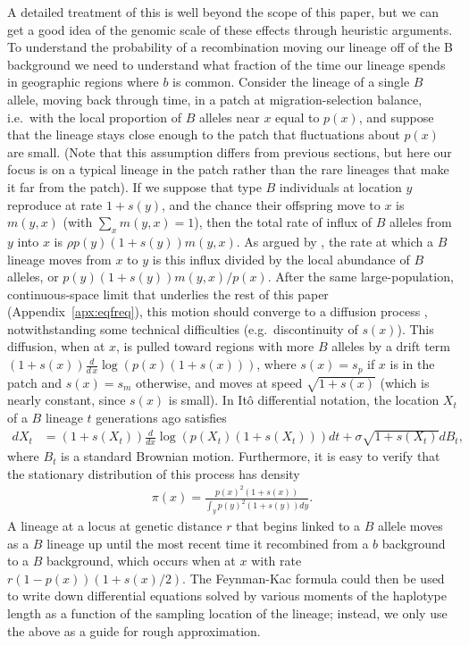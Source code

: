 \documentclass{article}
\begin{document}
A detailed treatment of this is well beyond the scope of this paper,
but we can get a good idea of the genomic scale of these effects through heuristic arguments.
To understand the probability of a recombination moving our lineage
off of the B background we need to understand what fraction of the
time our lineage spends in geographic regions where $b$ is common. 
Consider the lineage of a single $B$ allele, moving back through time,
in a patch at migration-selection balance, 
i.e.\ with the local proportion of $B$ alleles near $x$ equal to $p(x)$,
and suppose that the lineage stays close enough to the patch 
that fluctuations about $p(x)$ are small. 
(Note that this assumption differs from
previous sections, but here our focus is on a typical lineage in the
patch rather than the rare lineages that make it far from the patch).
If we suppose that type $B$ individuals at location $y$ reproduce at rate $1+s(y)$,
and the chance their offspring move to $x$ is $m(y,x)$ (with $\sum_x m(y,x)=1$),
then the total rate of influx of $B$ alleles from $y$ into $x$ is $\rho p(y) (1+s(y)) m(y,x)$.
As argued by \citet{hudson1988coalescent}, the rate at which a $B$ lineage moves from $x$ to $y$
is this influx divided by the local abundance of $B$ alleles,
or $p(y) (1+s(y)) m(y,x) / p(x) $.
After the same large-population, continuous-space limit that underlies the rest of this paper (Appendix~\ref{apx:eqfreq}),
this motion should converge to a diffusion process \citep[as assumed by e.g.][]{hallatschek2008surfing},
notwithstanding some technical difficulties (e.g.\ discontinuity of $s(x)$).
This diffusion, when at $x$, 
is pulled toward regions with more $B$ alleles
by a drift term $(1+s(x))\frac{d}{d\,x} \log( p(x) (1+s(x)) )$,
where $s(x)=s_p$ if $x$ is in the patch and $s(x)=s_m$ otherwise, 
and moves at speed $\sqrt{1+s(x)}$ (which is nearly constant, since $s(x)$ is small).
In It\^o differential notation, 
the location $X_t$ of a $B$ lineage $t$ generations ago satisfies
\begin{align}
    d X_t &= (1+s(X_t)) \frac{d}{dx} \log( p(X_t) (1+s(X_t)) ) dt + \sigma \sqrt{1+s(X_t)} dB_t,
\end{align}
where $B_t$ is a standard Brownian motion.
Furthermore, it is easy to verify that the stationary distribution of this process has density
\begin{align}
  \pi(x) = \frac{ p(x)^2 (1+s(x)) }{ \int_y p(y)^2 (1+s(y)) dy } . \label{eqn:lineagestatdist}
\end{align}
A lineage at a locus at genetic distance $r$ that begins linked to a $B$ allele
moves as a $B$ lineage up until the most recent time
it recombined from a $b$ background to a $B$ background,
which occurs when at $x$ with rate $r (1-p(x)) (1+s(x)/2)$.
The Feynman-Kac formula could then be used to write down differential equations
solved by various moments of the haplotype length as a function of the sampling location of the lineage;
instead, we only use the above as a guide for rough approximation.
\end{document}
